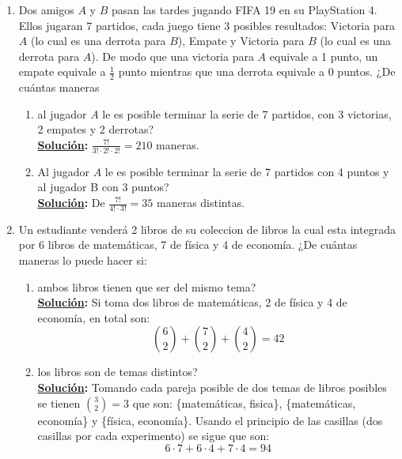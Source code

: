 \documentclass[11pt,letterpaper]{report}
\newcommand{\sol}{\textbf{\underline{Solución}: }} %
\begin{document}
\begin{enumerate}
\begin{enumerate}[label=\alph*)]
    \item los de literatura siempre tienen que estar juntos, pero los de los otros temas pueden estar
    acomodados en cualquier orden?\\
    \sol Como los libros de literatura deben de estar juntos, los podemos considerar como un lote,
    teniendo así que las formas de ordenar los libros de ese lote son $4!$. Como quedan los
    otros 3 libros restantes, la formas de ordenarlos son $3!$.\\
    Quedando así $4! \cdot 3! = 144$ diferentes maneras.
\end{enumerate}

\item Dos amigos $A$ y $B$ pasan las tardes jugando FIFA 19 en su PlayStation 4. Ellos jugaran 7 partidos,
cada juego tiene 3 posibles resultados: Victoria para $A$ (lo cual es una derrota para $B$), 
Empate y Victoria para $B$ (lo cual es una derrota para $A$). De modo que una victoria para $A$
equivale a 1 punto, un empate equivale a $\frac{1}{2}$ punto mientras que una derrota equivale
a 0 puntos. ¿De cuántas maneras
\begin{enumerate}[label=\alph*)]
    \item al jugador $A$ le es posible terminar la serie de 7 partidos, con 3 victorias, 2 empates y 2 derrotas?\\
    \sol $\frac{7!}{3! \cdot 2! \cdot 2!} = 210$ maneras.

    \item Al jugador $A$ le es posible terminar la serie de 7 partidos con 4 puntos y al jugador B con 3 puntos?\\
    \sol De $\frac{7!}{4! \cdot 3!} = 35$ maneras distintas.
\end{enumerate}

\item Un estudiante venderá 2 libros de su coleccion de libros la cual esta integrada por 6 libros de
matemáticas, 7 de física y 4 de economía. ¿De cuántas maneras lo puede hacer si:
\begin{enumerate}[label=\alph*)]
    \item ambos libros tienen que ser del mismo tema?\\
    \sol Si toma dos libros de matemáticas, 2 de física y 4 de economía, en total son:
    $$\binom{6}{2} + \binom{7}{2} + \binom{4}{2} = 42$$
    \item los libros son de temas distintos?\\
    \sol Tomando cada pareja posible de dos temas de libros posibles se tienen $\binom{3}{2} = 3$
    que son: \{matemáticas, fisica\}, \{matemáticas, economía\} y \{física, economía\}.
    Usando el principio de las casillas (dos casillas por cada experimento) se sigue que son:
    $$6 \cdot 7 + 6 \cdot 4 + 7 \cdot 4 = 94$$
\end{enumerate}


\end{enumerate}
\end{document}

